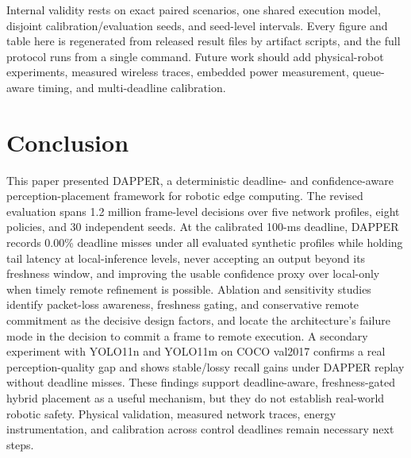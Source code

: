 \documentclass[conference,a4paper]{IEEEtran}
\begin{document}
Internal validity rests on exact paired scenarios, one shared execution model, disjoint calibration/evaluation seeds, and seed-level intervals. Every figure and table here is regenerated from released result files by artifact scripts, and the full protocol runs from a single command. Future work should add physical-robot experiments, measured wireless traces, embedded power measurement, queue-aware timing, and multi-deadline calibration.

\section{Conclusion}
This paper presented DAPPER, a deterministic deadline- and confidence-aware perception-placement framework for robotic edge computing. The revised evaluation spans 1.2 million frame-level decisions over five network profiles, eight policies, and 30 independent seeds. At the calibrated 100-ms deadline, DAPPER records 0.00\% deadline misses under all evaluated synthetic profiles while holding tail latency at local-inference levels, never accepting an output beyond its freshness window, and improving the usable confidence proxy over local-only when timely remote refinement is possible. Ablation and sensitivity studies identify packet-loss awareness, freshness gating, and conservative remote commitment as the decisive design factors, and locate the architecture's failure mode in the decision to commit a frame to remote execution. A secondary experiment with YOLO11n and YOLO11m on COCO val2017 confirms a real perception-quality gap and shows stable/lossy recall gains under DAPPER replay without deadline misses. These findings support deadline-aware, freshness-gated hybrid placement as a useful mechanism, but they do not establish real-world robotic safety. Physical validation, measured network traces, energy instrumentation, and calibration across control deadlines remain necessary next steps.
\end{document}
